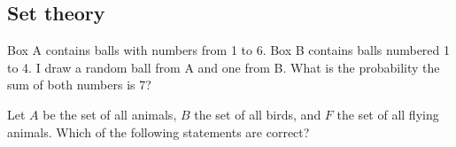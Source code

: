 \documentclass{ximera}
\begin{document}
\subsection*{Set theory}
\begin{question}
Box A contains balls with numbers from 1 to 6.  Box B contains balls numbered 1 to 4.   I draw a random ball from A and one from B.  What is the probability the sum of both numbers is 7?
\end{question}

\begin{question}
Let $A$ be the set of all animals, $B$ the set of all birds, and $F$
the set of all flying animals. Which of the following statements are correct?
\begin{solution}
\begin{multiple-choice}
\end{multiple-choice}
\end{solution}
\end{question}
\end{document}
